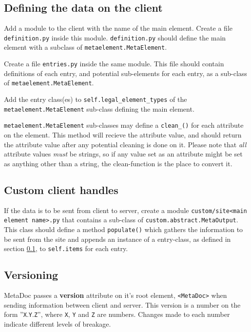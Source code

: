 \documentclass[titlepage, a4paper,10pt]{article}
\begin{document}
\subsection{Defining the data on the client}
\label{sec:defclientmodel}
Add a module to the client with the name of the main element. Create a file
\texttt{definition.py} inside this module. \texttt{definition.py} should define
the main element with a subclass of \texttt{metaelement.MetaElement}.

Create a file \texttt{entries.py} inside the same module. This file should
contain definitions of each entry, and potential sub-elements for each entry,
as a sub-class of \texttt{metaelement.MetaElement}. 

Add the entry class(es) to \texttt{self.legal\_element\_types} of the \\ 
\texttt{metaelement.MetaElement} sub-class defining the main element. 

\texttt{metaelement.MetaElement} sub-classes may define a
\texttt{clean\_<attribute name>()} for each attribute on the element. This method
will recieve the attribute value, and should return the attribute value after
any potential cleaning is done on it. Please note that \textit{all} attribute
values \textit{must} be strings, so if any value set as an attribute might be
set as anything other than a string, the clean-function is the place to convert
it.

\subsection{Custom client handles}
If the data is to be sent from client to server, create a module
\texttt{custom/site<main element name>.py} that contains a sub-class of
\texttt{custom.abstract.MetaOutput}. This class should define a method
\texttt{populate()} which gathers the information to be sent from the site and
appends an instance of a entry-class, as defined in section
\ref{sec:defclientmodel}, to \texttt{self.items} for each entry.

\subsection{Versioning}
MetaDoc passes a \textbf{version} attribute on it's root element,
\texttt{<MetaDoc>} when sending information between client and server. This
version is a number on the form ''\texttt{X}.\texttt{Y}.\texttt{Z}'', where
\texttt{X}, \texttt{Y} and \texttt{Z} are numbers. Changes made to each number 
indicate different levels of breakage. 
\end{document}
